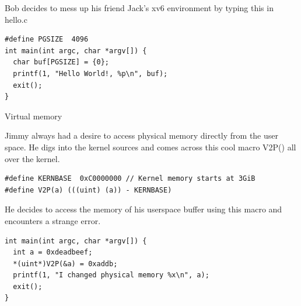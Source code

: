 \documentclass[11pt]{exam}
\begin{document}
\begin{questions}
Bob decides to mess up his friend Jack's xv6 environment by typing this in
hello.c
\begin{verbatim}
#define PGSIZE  4096
int main(int argc, char *argv[]) {
  char buf[PGSIZE] = {0};
  printf(1, "Hello World!, %p\n", buf);
  exit();
}
\end{verbatim}


\newpage
\addpoints
\question Virtual memory

Jimmy always had a desire to access physical memory directly from the user
space. He digs into the kernel sources and comes across this cool macro
V2P() all over the kernel.
\begin{verbatim}
#define KERNBASE  0xC0000000 // Kernel memory starts at 3GiB
#define V2P(a) (((uint) (a)) - KERNBASE)
\end{verbatim}

He decides to access the memory of his userspace buffer using this macro
and encounters a strange error.
\begin{verbatim}
int main(int argc, char *argv[]) {
  int a = 0xdeadbeef;
  *(uint*)V2P(&a) = 0xaddb;
  printf(1, "I changed physical memory %x\n", a);
  exit();
}
\end{verbatim}




\end{questions}
\end{document}
